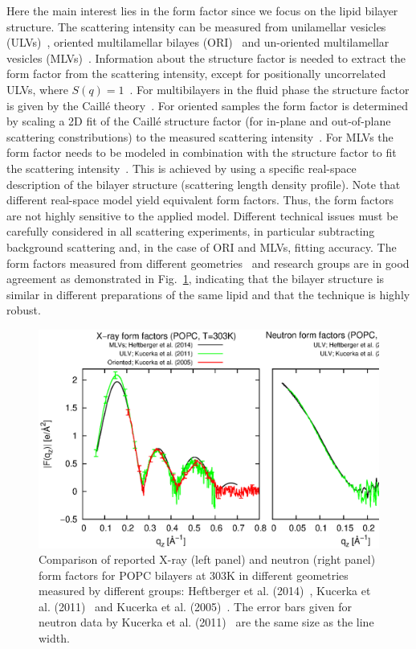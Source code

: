 \documentclass[aps,prl,superscriptaddress,twocolumn]{revtex4}
\begin{document}
Here the main interest lies in the form factor since we focus on the lipid bilayer structure.
The scattering intensity can be measured from unilamellar vesicles (ULVs)~\cite{marquardt15}, 
oriented multilamellar bilayes (ORI)~\cite{Lyatskaya.2001,kucerka05a} and un-oriented multilamellar vesicles (MLVs)~\cite{Heftberger.2014}.
Information about the structure factor is needed to extract the 
form factor from the scattering intensity, except for positionally uncorrelated ULVs, where $S(q)=1$~\cite{marquardt15}. 
For multibilayers in the fluid phase the structure factor is given by the Caill\'{e} theory~\cite{Zhang.1994,Lyatskaya.2001}. 
For oriented samples the form factor is determined by scaling a 2D fit of the Caill\'{e} structure factor 
(for in-plane and out-of-plane scattering constributions) to the measured scattering intensity~\cite{Lyatskaya.2001,kucerka05a}.
For MLVs the form factor needs to be modeled in combination with the structure factor to fit the scattering intensity~\cite{Heftberger.2014}. This is achieved by using a specific real-space description of the bilayer structure (scattering length density profile). Note that different real-space model yield equivalent form factors. Thus, the form factors are not highly sensitive to the applied model.
Different technical issues must be carefully considered in all scattering experiments, in particular 
subtracting background scattering and, in the case of ORI and MLVs, fitting accuracy. The form factors measured 
from different geometries~\cite{kucerka05a,kucerka05b,kucerka07} and research groups are in good agreement
as demonstrated in Fig.~\ref{FFs}, indicating that the bilayer structure is similar in different preparations of the same lipid and that the technique is highly robust.
\begin{figure}[]
	\includegraphics[width=17.2cm]{../Fig/FFs.eps}
	\caption{\label{FFs}
		Comparison of reported X-ray (left panel) and neutron (right panel) form factors for POPC bilayers at 303K in different geometries
                measured by different groups: Heftberger et al. (2014)~\cite{Heftberger.2014}, Kucerka et al. (2011)~\cite{kucerka11} and Kucerka et al. (2005)~\cite{kucerka05b}.
                The error bars given for neutron data by Kucerka et al. (2011)~\cite{kucerka11} are the same size as the line width.
	} 
\end{figure}
\end{document}
